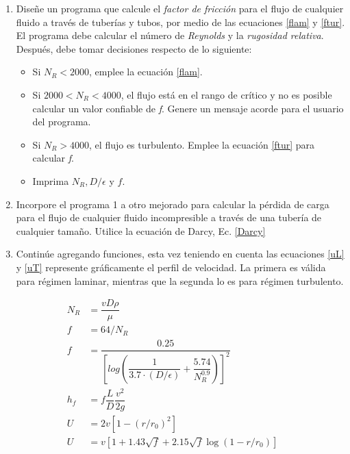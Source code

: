 \documentclass[12pt, oneside, a4paper, spanish]{article}
\begin{document}
\begin{enumerate}
	\item Diseñe un programa que calcule el \emph{factor de fricción} para el flujo de cualquier fluido a través de tuberías y tubos, por medio de las ecuaciones \eqref{flam} y \eqref{ftur}. El programa debe calcular el número de \emph{Reynolds} y la \emph{rugosidad relativa}. Después, debe tomar decisiones respecto de lo siguiente:
	
	\begin{itemize}
		\item Si $N_{R} < 2000$, emplee la ecuación \eqref{flam}.
		\item Si $2000 < N_{R} < 4000$, el flujo está en el rango de crítico y no es posible calcular un valor confiable de \emph{f}. Genere un mensaje acorde para el usuario del programa.
		\item Si $N_{R} > 4000$, el flujo es turbulento. Emplee la ecuación \eqref{ftur} para calcular \emph{f}.
		\item Imprima $N_{R}, D/\epsilon$ y $f$.
	\end{itemize}
	
	\item Incorpore el programa 1 a otro mejorado para calcular la pérdida de carga para el flujo de cualquier fluido incompresible a través de una tubería de cualquier tamaño. Utilice la ecuación de Darcy, Ec. \eqref{Darcy}  
	
	\item Continúe agregando funciones, esta vez teniendo en cuenta las ecuaciones \eqref{uL} y \eqref{uT} represente gráficamente el perfil de velocidad. La primera es válida para régimen laminar, mientras que la segunda lo es para régimen turbulento.
\end{enumerate}

\begin{tcolorbox}[colback=black!5!white,colframe=white!50!black,title=Ecuaciones a utilizar]
	\begin{align}
	N_R &= \dfrac{vD\rho}{\mu}\\[1em]
	f &= 64/N_{R}\label{flam}\\[1em]
	f &= \dfrac{0.25}{
		\left[log\left(\dfrac{1}{3.7 \cdot (D/\epsilon)}+
		\dfrac{5.74}{N^{0.9}_{R}}\right)\right]^{2}}\label{ftur}\\[1em]
	h_f &= f \dfrac{L}{D} \dfrac{v^2}{2g}\label{Darcy}\\[1em]
	U &= 2v[1-(r/r_{0})^{2}]\label{uL}\\[1em]
	U &= v[1 + 1.43 \sqrt{f}+2.15 \sqrt{f}\log(1-r/r_{0})]\label{uT}
	\end{align}
\end{tcolorbox}
\end{document}
